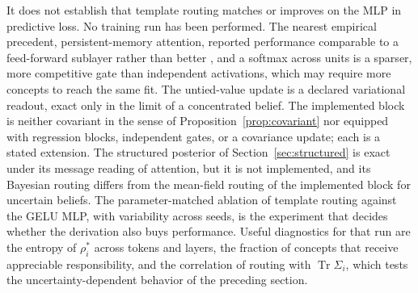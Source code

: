 \documentclass[11pt]{article}
\theoremstyle{definition}
\theoremstyle{remark}
\newcommand{\Tr}{\operatorname{Tr}}
\begin{document}
It does not establish that template routing matches or improves on the MLP in predictive loss. No training run has been performed. The nearest empirical precedent, persistent-memory attention, reported performance comparable to a feed-forward sublayer rather than better \citep{sukhbaatar2019}, and a softmax across units is a sparser, more competitive gate than independent activations, which may require more concepts to reach the same fit. The untied-value update is a declared variational readout, exact only in the limit of a concentrated belief. The implemented block is neither covariant in the sense of Proposition~\ref{prop:covariant} nor equipped with regression blocks, independent gates, or a covariance update; each is a stated extension. The structured posterior of Section~\ref{sec:structured} is exact under its message reading of attention, but it is not implemented, and its Bayesian routing differs from the mean-field routing of the implemented block for uncertain beliefs. The parameter-matched ablation of template routing against the GELU MLP, with variability across seeds, is the experiment that decides whether the derivation also buys performance. Useful diagnostics for that run are the entropy of $\rho^{*}_i$ across tokens and layers, the fraction of concepts that receive appreciable responsibility, and the correlation of routing with $\Tr\Sigma_i$, which tests the uncertainty-dependent behavior of the preceding section.
\end{document}
